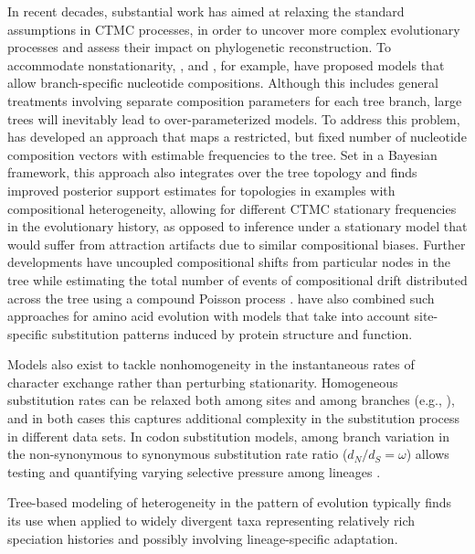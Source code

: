 In recent decades, substantial work has aimed at relaxing the standard assumptions in CTMC processes, in order to uncover more complex evolutionary processes and assess their impact on phylogenetic reconstruction. 
To accommodate nonstationarity, \citet{Yang1995}, \citet{Galtier1998} and \citet{Galtier1999}, for example, have proposed models that allow branch-specific nucleotide compositions.
Although this includes general treatments involving separate composition parameters for each tree branch, large trees will inevitably lead to over-parameterized models.
To address this problem, \citet{Foster2004} has developed an approach that maps a restricted, but fixed number of nucleotide composition vectors with estimable frequencies to the tree. 
Set in a Bayesian framework, this approach also integrates over the tree topology and finds improved posterior support estimates for topologies in examples with compositional heterogeneity, allowing for different CTMC stationary frequencies in the evolutionary history, 
as opposed to inference under a stationary model that would suffer from attraction artifacts due to similar compositional biases. 
Further developments have uncoupled compositional shifts from particular nodes in the tree while estimating the total number of events of compositional drift distributed across the tree using a compound Poisson process \citep{Blanquart2006}. 
\cite{Blanquart2008} have also combined such approaches for amino acid evolution with models that take into account site-specific substitution patterns induced by protein structure and function.

Models also exist to tackle nonhomogeneity in the instantaneous rates of character exchange rather than perturbing stationarity.
Homogeneous substitution rates can be relaxed both among sites \citep{Huelsenbeck1999} and among branches (e.g., \citet{Foster12082009}), and in both cases this captures additional complexity in the substitution process in different data sets. 
In codon substitution models, among branch variation in the non-synonymous to synonymous substitution rate ratio ($d_N/d_S = \omega$) allows testing and quantifying varying selective pressure among lineages \citep{Yang1998}.

\par  %

Tree-based modeling of heterogeneity in the pattern of evolution typically finds its use when applied to widely divergent taxa representing relatively rich speciation histories and possibly involving lineage-specific adaptation.


